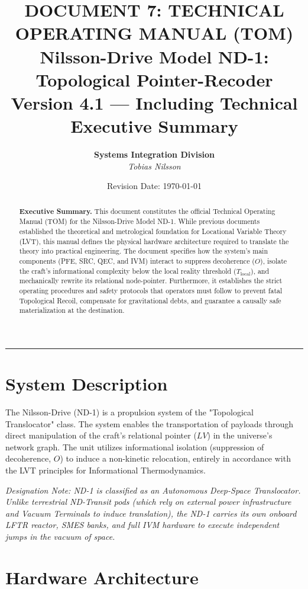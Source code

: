 \documentclass[12pt,a4paper]{article}
\title{\Huge \textbf{DOCUMENT 7: TECHNICAL OPERATING MANUAL (TOM)} \\[0.3em] \Large Nilsson-Drive Model ND-1: Topological Pointer-Recoder \\[0.5em]
\normalsize Version 4.1 --- Including Technical Executive Summary}
\author{\textbf{Systems Integration Division} \\ \textit{Tobias Nilsson}}
\date{Revision Date: \today}
\begin{document}
\maketitle

\vspace{-1em}
\begin{abstract}
\noindent
\textbf{Executive Summary.} This document constitutes the official Technical Operating Manual (TOM) for the Nilsson-Drive Model ND-1. While previous documents established the theoretical and metrological foundation for Locational Variable Theory (LVT), this manual defines the physical hardware architecture required to translate the theory into practical engineering. The document specifies how the system's main components (PFE, SRC, QEC, and IVM) interact to suppress decoherence ($O$), isolate the craft's informational complexity below the local reality threshold ($T_{\mathrm{local}}$), and mechanically rewrite its relational node-pointer. Furthermore, it establishes the strict operating procedures and safety protocols that operators must follow to prevent fatal Topological Recoil, compensate for gravitational debts, and guarantee a causally safe materialization at the destination.
\end{abstract}

\vspace{1em}
\hrule
\vspace{1em}

\tableofcontents
\newpage

\section{System Description}
The Nilsson-Drive (ND-1) is a propulsion system of the "Topological Translocator" class. The system enables the transportation of payloads through direct manipulation of the craft's relational pointer ($LV$) in the universe's network graph. The unit utilizes informational isolation (suppression of decoherence, $O$) to induce a non-kinetic relocation, entirely in accordance with the LVT principles for Informational Thermodynamics.

​\textit{Designation Note: ND-1 is classified as an Autonomous Deep-Space Translocator. Unlike terrestrial ND-Transit pods (which rely on external power infrastructure and Vacuum Terminals to induce translation), the ND-1 carries its own onboard LFTR reactor, SMES banks, and full IVM hardware to execute independent jumps in the vacuum of space.}

\section{Hardware Architecture}
\end{document}
